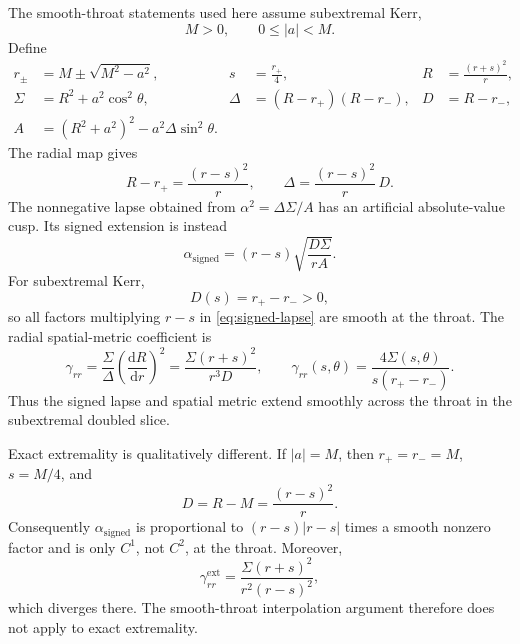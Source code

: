 \documentclass[11pt]{article}
\newcommand{\dd}{\mathrm{d}}
\newcommand{\RBL}{R}
\begin{document}
The smooth-throat statements used here assume subextremal Kerr,
\begin{equation}
 M>0,\qquad 0\leq\lvert a\rvert<M.
 \label{eq:subextremal-domain}
\end{equation}
Define
\begin{align}
 r_\pm&=M\pm\sqrt{M^2-a^2},&
 s&=\frac{r_+}{4},&
 \RBL&=\frac{(r+s)^2}{r},\nonumber\\
 \Sigma&=\RBL^2+a^2\cos^2\theta,&
 \Delta&=(\RBL-r_+)(\RBL-r_-),&
 D&=\RBL-r_-,\label{eq:kerr-throat-definitions}\\
 A&=(\RBL^2+a^2)^2-a^2\Delta\sin^2\theta.&&&
 \nonumber
\end{align}
The radial map gives
\begin{equation}
 \RBL-r_+=\frac{(r-s)^2}{r},
 \qquad
 \Delta=\frac{(r-s)^2}{r}\,D.
 \label{eq:throat-factorization}
\end{equation}
The nonnegative lapse obtained from
\(\alpha^2=\Delta\Sigma/A\) has an artificial absolute-value cusp.  Its signed
extension is instead
\begin{equation}
 \boxed{\alpha_{\mathrm{signed}}
 =(r-s)\sqrt{\frac{D\Sigma}{rA}}.}
 \label{eq:signed-lapse}
\end{equation}
For subextremal Kerr,
\begin{equation}
 D(s)=r_+-r_->0,
 \label{eq:D-throat}
\end{equation}
so all factors multiplying \(r-s\) in
\cref{eq:signed-lapse} are smooth at the throat.  The radial spatial-metric
coefficient is
\begin{equation}
 \gamma_{rr}
 =\frac{\Sigma}{\Delta}\left(\frac{\dd\RBL}{\dd r}\right)^2
 =\frac{\Sigma(r+s)^2}{r^3D},
 \qquad
 \gamma_{rr}(s,\theta)
 =\frac{4\Sigma(s,\theta)}{s(r_+-r_-)}.
 \label{eq:radial-throat-limit}
\end{equation}
Thus the signed lapse and spatial metric extend smoothly across the throat in
the subextremal doubled slice.

Exact extremality is qualitatively different.  If
\(\lvert a\rvert=M\), then \(r_+=r_-=M\), \(s=M/4\), and
\begin{equation}
 D=\RBL-M=\frac{(r-s)^2}{r}.
 \label{eq:extremal-D}
\end{equation}
Consequently \(\alpha_{\mathrm{signed}}\) is proportional to
\((r-s)\lvert r-s\rvert\) times a smooth nonzero factor and is only \(C^1\),
not \(C^2\), at the throat.  Moreover,
\begin{equation}
 \gamma_{rr}^{\mathrm{ext}}
 =\frac{\Sigma(r+s)^2}{r^2(r-s)^2},
 \label{eq:extremal-radial-divergence}
\end{equation}
which diverges there.  The smooth-throat interpolation argument therefore
does not apply to exact extremality.
\end{document}

